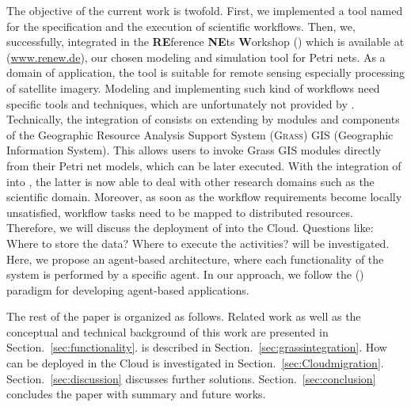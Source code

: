 The objective of the current work is twofold.
%
First, we implemented a tool named \RenewGrass{} for the specification and the execution of scientific workflows.
%
Then, we, successfully, integrated \RenewGrass{} in the \textbf{RE}ference \textbf{NE}ts \textbf{W}orkshop (\Renew{}) which is available at (\url{www.renew.de}), our chosen modeling and simulation tool for Petri nets.
%
%
As a domain of application, the tool is suitable for remote sensing especially processing of satellite imagery.
%
%
Modeling and implementing such kind of workflows need specific tools and techniques, which are unfortunately not provided by \Renew{}.
%
Technically, the integration of \RenewGrass{} consists on extending  \Renew{} by modules and components of the Geographic Resource Analysis Support System (\textsc{Grass}) GIS (Geographic Information System).
%
This allows users to invoke Grass GIS modules directly from their Petri net models, which can be later executed.
%
With the integration of \RenewGrass{} into \Renew{}, the latter is now able to deal with other research domains such as the scientific domain.
%
Moreover, as soon as the workflow requirements become locally unsatisfied, workflow tasks need to be mapped to distributed resources.
%
%
Therefore, we will discuss the deployment of \RenewGrass{} into the Cloud.
%
Questions like: Where to store the data? Where to execute the activities? will be investigated.
%
Here, we propose an agent-based architecture, where each functionality of the system is performed by a specific agent.
%
In our approach, we follow the \Paosel{} (\Paose{}) paradigm for developing agent-based applications.
%

The rest of the paper is organized as follows. 
%
Related work as well as the conceptual and technical background of this work are presented in Section.~\ref{sec:functionality}.
%
\RenewGrass{} is described in Section.~\ref{sec:grassintegration}. 
%
How \RenewGrass{} can be deployed in the Cloud is investigated in Section.~\ref{sec:Cloudmigration}.
%
Section.~\ref{sec:discussion} discusses further solutions.
%
Section.~\ref{sec:conclusion} concludes the paper with summary and future works.






